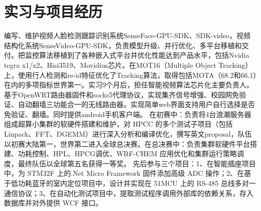 \documentclass[11pt,a4paper]{moderncv}
\begin{document}
\section{实习与项目经历}
{编写、维护视频人脸检测跟踪识别系统SenseFace-GPU-SDK、SDK-video，视频结构化系统SenseVideo-GPU-SDK，负责模型升级、并行优化、多平台移植和交付。把监控算法移植到了各种嵌入式平台并优化性能达到产品水平，包括Nvidia tegra x1/x2、Hisi3519、Movidius芯片。在MOT16（Multiple Object Tracking）上，使用行人检测和re-id特征优化了Tracking算法，取得包括MOTA（68.2和66.1）在内的多项指标世界第一。实习9个月后，担任智能视频算法芯片化主要负责人。
}
{基于OpenWRT路由器固件和socks5代理协议，实现集齐信号增强、校园网免验证、自动翻墙三功能合一的无线路由器。实现简单web界面支持用户自行选择是否免验证、翻墙。同时提供android手机客户端。}
{在初赛中：负责将4台浪潮服务器组成超算小集群的软硬件搭建和维护，对 HPCC 的多个测试子项目（包括 Linpack、FFT、DGEMM）进行深入分析和编译优化，撰写英文proposal，队伍以初赛大陆第一，世界第二进入全球总决赛。在总决赛中：负责集群软硬件平台搭建、功耗控制、HPL、HPCG调优、WRF-CHEM 应用优化和集群运行策略调度，最终队伍以全球第五名获得一等奖。} 
{先后参与三个项目：1、在智能插座项目中，为 STM32F 上的.Net Micro Framework 固件添加高级 ADC 操作；2、在基于低功耗蓝牙的室内定位项目中，设计并实现在 51MCU 上的 RS-485 总线多对一通信协议；3、在自动化测试项目中，提取测试程序调用外部库的依赖关系，存入数据库并对外提供 WCF 接口。} 
\end{document}
